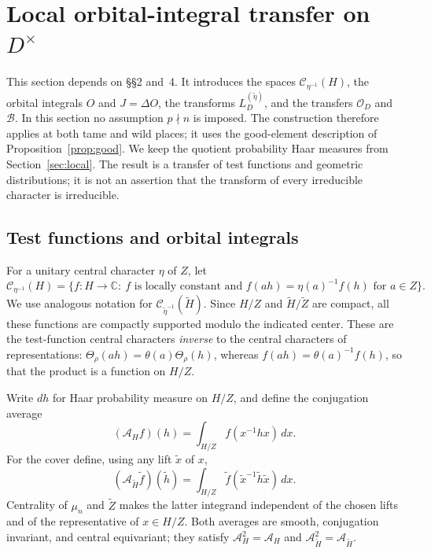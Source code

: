 \documentclass[11pt]{article}
\newcommand{\tH}{\widetilde H}
\newcommand{\tZ}{\widetilde Z}
\theoremstyle{plain}
\theoremstyle{definition}
\begin{document}
\section{Local orbital-integral transfer on \texorpdfstring{$D^\times$}{D x}}\label{sec:orbital}
This section depends on \S\S2 and~4. It introduces the spaces $\mathcal C_{\eta^{-1}}(H)$, the orbital integrals $O$ and $J=\Delta O$, the transforms $L_D^{(\widetilde\eta)}$, and the transfers $\mathcal O_D$ and $\mathcal B$. In this section no assumption $p\nmid n$ is imposed. The construction therefore
applies at both tame and wild places; it uses the good-element description of
Proposition~\ref{prop:good}. We keep the quotient probability Haar measures from
Section~\ref{sec:local}. The result is a transfer of test functions and geometric
distributions; it is not an assertion that the transform of every irreducible
character is irreducible.

\subsection{Test functions and orbital integrals}
For a unitary central character $\eta$ of $Z$, let
\[
\mathcal C_{\eta^{-1}}(H)
=\{f:H\to\mathbb C:\ f\text{ is locally constant and }
                   f(ah)=\eta(a)^{-1}f(h)\text{ for }a\in Z\}.
\]
We use analogous notation for $\mathcal C_{\widetilde\eta^{-1}}(\tH)$.
Since $H/Z$ and $\tH/\tZ$ are compact, all these functions are compactly
supported modulo the indicated center. These are the test-function central
characters \emph{inverse} to the central characters of representations:
$\Theta_\rho(ah)=\theta(a)\Theta_\rho(h)$, whereas
$f(ah)=\theta(a)^{-1}f(h)$, so that the product is a function on $H/Z$.

Write $dh$ for Haar probability measure on $H/Z$, and define the
conjugation average
\begin{equation}\label{eq:avg-H}
(\mathcal A_Hf)(h)
=\int_{H/Z}f(x^{-1}hx)\,dx.
\end{equation}
For the cover define, using any lift $\widetilde x$ of $x$,
\begin{equation}\label{eq:avg-cover}
(\mathcal A_{\tH}\widetilde f)(\widetilde h)
=\int_{H/Z}\widetilde f(\widetilde x^{-1}\widetilde h\widetilde x)\,dx.
\end{equation}
Centrality of $\mu_n$ and $\tZ$ makes the latter integrand independent of
the chosen lifts and of the representative of $x\in H/Z$. Both averages
are smooth, conjugation invariant, and central equivariant; they satisfy
$\mathcal A_H^2=\mathcal A_H$ and
$\mathcal A_{\tH}^2=\mathcal A_{\tH}$.
\end{document}

